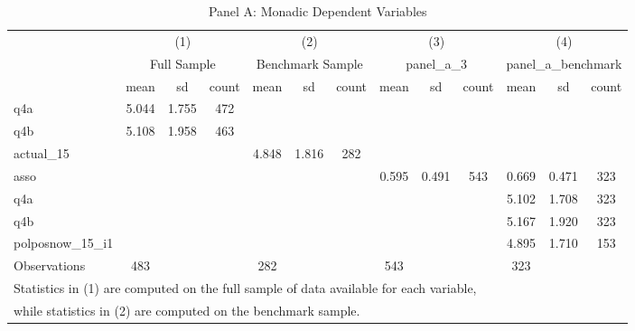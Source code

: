 \begin{table}[htbp]\centering
\def\sym#1{\ifmmode^{#1}\else\(^{#1}\)\fi}
\caption{Panel A: Monadic Dependent Variables}
\begin{tabular}{l*{4}{ccc}}
\toprule
                    &\multicolumn{3}{c}{(1)}               &\multicolumn{3}{c}{(2)}               &\multicolumn{3}{c}{(3)}               &\multicolumn{3}{c}{(4)}               \\
                    &\multicolumn{3}{c}{Full Sample}       &\multicolumn{3}{c}{Benchmark Sample}  &\multicolumn{3}{c}{panel\_a\_3}         &\multicolumn{3}{c}{panel\_a\_benchmark} \\
                    &        mean&          sd&       count&        mean&          sd&       count&        mean&          sd&       count&        mean&          sd&       count\\
\midrule
q4a                 &       5.044&       1.755&         472&            &            &            &            &            &            &            &            &            \\
q4b                 &       5.108&       1.958&         463&            &            &            &            &            &            &            &            &            \\
actual\_15           &            &            &            &       4.848&       1.816&         282&            &            &            &            &            &            \\
asso                &            &            &            &            &            &            &       0.595&       0.491&         543&       0.669&       0.471&         323\\
q4a                 &            &            &            &            &            &            &            &            &            &       5.102&       1.708&         323\\
q4b                 &            &            &            &            &            &            &            &            &            &       5.167&       1.920&         323\\
polposnow\_15\_i1     &            &            &            &            &            &            &            &            &            &       4.895&       1.710&         153\\
\midrule
Observations        &         483&            &            &         282&            &            &         543&            &            &         323&            &            \\
\bottomrule
\multicolumn{13}{l}{\footnotesize Statistics in (1) are computed on the full sample of data available for each variable,}\\
\multicolumn{13}{l}{\footnotesize while statistics in (2) are computed on the benchmark sample.}\\
\end{tabular}
\end{table}
